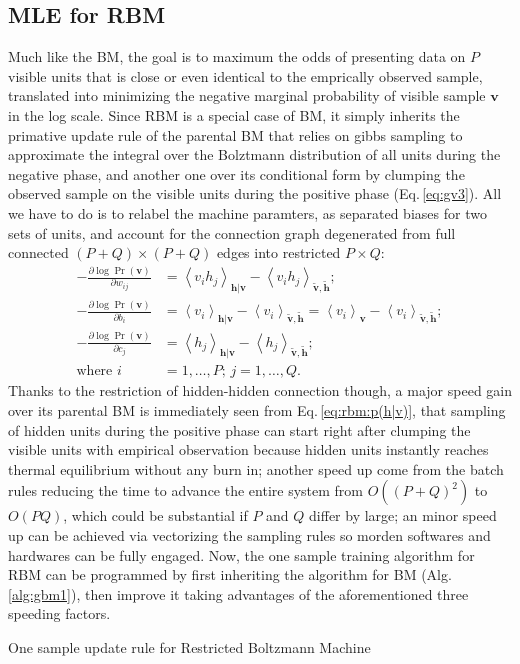 \documentclass[11pt]{article}
\newcommand{\mean}[2]{\left\langle{#1}\right\rangle_{#2}}
\newcommand{\vh}{\boldsymbol{h}}
\newcommand{\vv}{\boldsymbol{v}}
\newcommand{\vht}{\tilde{\vh}}
\newcommand{\vvt}{\tilde{\vv}}
\newcommand{\PDV}[2]{\frac{\partial #1}{\partial #2}}
\begin{document}
{\subsection{MLE for RBM}
Much like the BM, the goal is to maximum the odds of presenting data on $P$ visible units that is close or even identical to the emprically observed sample, translated into minimizing the negative marginal probability of visible sample $\vv$ in the log scale. Since RBM is a special case of BM, it simply inherits the primative update rule of the parental BM that relies on gibbs sampling to approximate the integral over the Bolztmann distribution of all units during the negative phase, and another one over its conditional form by clumping the observed sample on the visible units during the positive phase (Eq.\,\ref{eq:gv3}). All we have to do is to relabel the machine paramters, as separated biases for two sets of units, and account for the connection graph degenerated from full connected $(P+Q) \times (P+Q)$ edges into restricted $P \times Q$:
\begin{align*}
  -\PDV{\log{\Pr(\vv)}}{w_{ij}} & = \mean{v_i h_j}{\vh|\vv} - \mean{v_i h_j}{\vvt, \vht}; \\
  -\PDV{\log{\Pr(\vv)}}{b_i} & = \mean{v_i}{\vh|\vv} - \mean{v_i}{\vvt, \vht} = \mean{v_i}{\vv} - \mean{v_i}{\vvt, \vht}; \\
  -\PDV{\log{\Pr(\vv)}}{c_j} & = \mean{h_j}{\vh|\vv} - \mean{h_j}{\vvt, \vht}; \\
  \textrm{where } i & = 1, \dots, P;\, j = 1, \dots, Q.
\end{align*}
Thanks to the restriction of hidden-hidden connection though, a major speed gain over its parental BM is immediately seen from Eq.\,\eqref{eq:rbm:p(h|v)}, that sampling of hidden units during the positive phase can start right after clumping the visible units with empirical observation because hidden units instantly reaches thermal equilibrium without any burn in; another speed up come from the batch rules reducing the time to advance the entire system from $O((P+Q)^2)$ to $O(PQ)$, which could be substantial if $P$ and $Q$ differ by large; an minor speed up can be achieved via vectorizing the sampling rules so morden softwares and hardwares can be fully engaged. Now, the one sample training algorithm for RBM can be programmed by first inheriting the algorithm for BM (Alg.\,\ref{alg:gbm1}), then improve it taking advantages of the aforementioned three speeding factors.
\begin{algorithm}[h]
  \caption{One sample update rule for Restricted Boltzmann Machine}\label{alg:rbm1}

\end{algorithm}}
\end{document}

